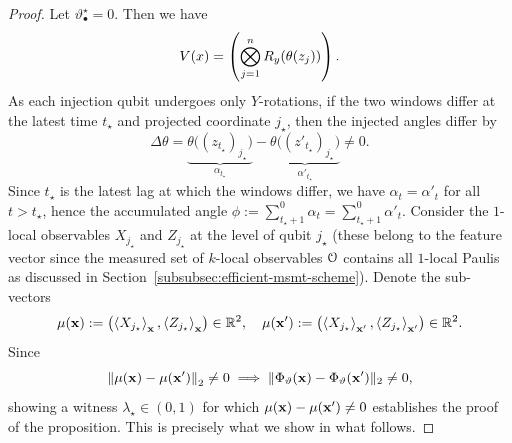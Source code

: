 \begin{proof}
    Let $\vartheta^\star_\bullet = 0$. Then we have 
    \begin{equation*}
        V(x) = \left(\bigotimes_{j=1}^n R_y(\theta(z_j))\right).
    \end{equation*}
    As each injection qubit undergoes only $Y$-rotations, if the two windows differ at the latest time $t_\star$ and projected coordinate $j_\star$, then the injected angles differ by
    \begin{equation*}
        \Delta \theta = \underbrace{\theta\big((z_{t_\star})_{j_\star} \big)}_{\alpha_{t_\star}} - \underbrace{\theta\big((z'_{t_\star})_{j_\star} \big)}_{\alpha'_{t_\star}} \neq 0.
    \end{equation*}
    Since $t_\star$ is the latest lag at which the windows differ, we have $\alpha_t = \alpha'_t$ for all $t > t_\star$, hence the accumulated angle $\phi := \sum_{t_\star + 1}^0 \alpha_t = \sum_{t_\star + 1}^0 \alpha'_t$. Consider the $1$-local observables $X_{j_\star}$ and $Z_{j_\star}$ at the level of qubit $j_\star$ (these belong to the feature vector since the measured set of $k$-local observables ${\mathcal{O}}$ contains all $1$-local Paulis as discussed in Section~\ref{subsubsec:efficient-msmt-scheme}). Denote the sub-vectors
    \begin{equation*}
        \mu({\mathbf{x}}) := \left(\Braket{X_{j_\star}}_{{\mathbf{x}}}, \Braket{Z_{j_\star}}_{{\mathbf{x}}}\right) \in {\mathbb{R}}^2, \quad \mu({\mathbf{x}}') := \left(\Braket{X_{j_\star}}_{{\mathbf{x}}'}, \Braket{Z_{j_\star}}_{{\mathbf{x}}'}\right) \in {\mathbb{R}}^2.
    \end{equation*}
    Since
    $$
    \left\lVert\mu({\mathbf{x}}) - \mu({\mathbf{x}}')\right\rVert_{2} \neq 0 \implies \|\Phi_{\vartheta}({\mathbf{x}})-\Phi_{\vartheta}({\mathbf{x}}')\|_2 \neq 0,
    $$
    showing a witness $\lambda_\star \in (0,1)$ for which $\mu({\mathbf{x}}) - \mu({\mathbf{x}}') \neq 0$ establishes the proof of the proposition. This is precisely what we show in what follows.


\end{proof}
